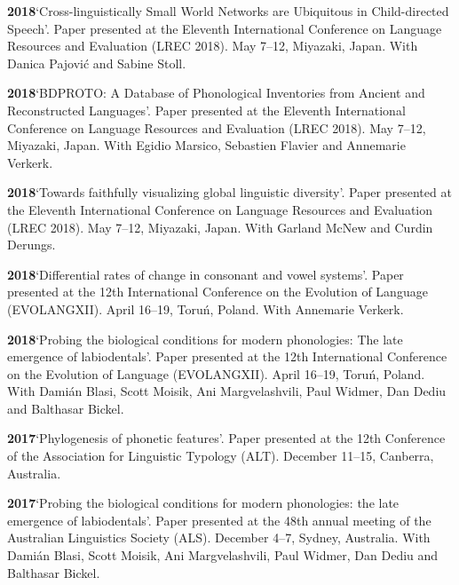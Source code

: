 \documentclass[11pt]{article}
\newcommand{\hangpara}{
 \setlength{\parindent}{0in} %
 \hangindent=0.42in %
}
\begin{document}
\hangpara
{\bf 2018}\hspace{1ex}`Cross-linguistically Small World Networks are Ubiquitous in Child-directed Speech'. Paper presented at the Eleventh International Conference on Language Resources and Evaluation (LREC 2018). May 7--12, Miyazaki, Japan. With Danica Pajovi{\'c} and Sabine Stoll.

\vskip 6pt
\hangpara
{\bf 2018}\hspace{1ex}`BDPROTO: A Database of Phonological Inventories from Ancient and Reconstructed Languages'. Paper presented at the Eleventh International Conference on Language Resources and Evaluation (LREC 2018). May 7--12, Miyazaki, Japan. With Egidio Marsico, Sebastien Flavier and Annemarie Verkerk.

\vskip 6pt
\hangpara
{\bf 2018}\hspace{1ex}`Towards faithfully visualizing global linguistic diversity'. Paper presented at the Eleventh International Conference on Language Resources and Evaluation (LREC 2018). May 7--12, Miyazaki, Japan. With Garland McNew and Curdin Derungs.

\vskip 6pt
\hangpara
{\bf 2018}\hspace{1ex}`Differential rates of change in consonant and vowel systems'. Paper presented at the 12th International Conference on the Evolution of Language (EVOLANGXII). April 16--19, Toru{\'n}, Poland. With Annemarie Verkerk. %

\vskip 6pt
\hangpara
{\bf 2018}\hspace{1ex}`Probing the biological conditions for modern phonologies: The late emergence of labiodentals'. Paper presented at the 12th International Conference on the Evolution of Language (EVOLANGXII). April 16--19, Toru{\'n}, Poland. With Dami{\'a}n Blasi, Scott Moisik, Ani Margvelashvili, Paul Widmer, Dan Dediu and Balthasar Bickel.

\vskip 6pt
\hangpara
{\bf 2017}\hspace{1ex}`Phylogenesis of phonetic features'. Paper presented at the 12th Conference of the Association for Linguistic Typology (ALT). December 11--15, Canberra, Australia.

\vskip 6pt
\hangpara
{\bf 2017}\hspace{1ex}`Probing the biological conditions for modern phonologies: the late emergence of labiodentals'. Paper presented at the 48th annual meeting of the Australian Linguistics Society (ALS). December 4--7, Sydney, Australia. With Dami{\'a}n Blasi, Scott Moisik, Ani Margvelashvili, Paul Widmer, Dan Dediu and Balthasar Bickel.
\end{document}
